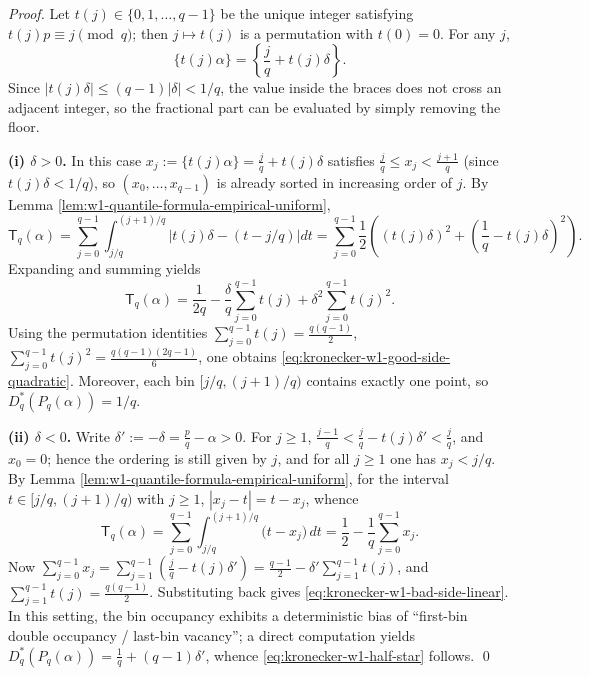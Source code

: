 \begin{proof}
Let \(t(j)\in\{0,1,\dots,q-1\}\) be the unique integer satisfying
\(
t(j)p\equiv j\pmod q
\);
then \(j\mapsto t(j)\) is a permutation with \(t(0)=0\).
For any \(j\),
\[
\{t(j)\alpha\}
=\left\{\frac{j}{q}+t(j)\delta\right\}.
\]
Since \(|t(j)\delta|\le (q-1)|\delta|<1/q\), the value inside the braces does not cross an adjacent integer, so the fractional part can be evaluated by simply removing the floor.
\par
\textbf{(i) \(\delta>0\).}
In this case \(x_j:=\{t(j)\alpha\}=\frac{j}{q}+t(j)\delta\) satisfies
\(
\frac{j}{q}\le x_j<\frac{j+1}{q}
\)
(since \(t(j)\delta<1/q\)), so \((x_0,\dots,x_{q-1})\) is already sorted in increasing order of \(j\).
By Lemma \ref{lem:w1-quantile-formula-empirical-uniform},
\[
\mathsf{T}_q(\alpha)=\sum_{j=0}^{q-1}\int_{j/q}^{(j+1)/q}\left|t(j)\delta-(t-j/q)\right|dt
=\sum_{j=0}^{q-1}\frac12\left((t(j)\delta)^2+\left(\frac1q-t(j)\delta\right)^2\right).
\]
Expanding and summing yields
\[
\mathsf{T}_q(\alpha)
=\frac1{2q}-\frac{\delta}{q}\sum_{j=0}^{q-1}t(j)+\delta^2\sum_{j=0}^{q-1}t(j)^2.
\]
Using the permutation identities
\(
\sum_{j=0}^{q-1}t(j)=\frac{q(q-1)}2
\),
\(
\sum_{j=0}^{q-1}t(j)^2=\frac{q(q-1)(2q-1)}6
\),
one obtains \eqref{eq:kronecker-w1-good-side-quadratic}.
Moreover, each bin \([j/q,(j+1)/q)\) contains exactly one point, so \(D_q^\ast(P_q(\alpha))=1/q\).
\par
\textbf{(ii) \(\delta<0\).}
Write \(\delta':=-\delta=\frac pq-\alpha>0\).
For \(j\ge 1\),
\(
\frac{j-1}{q}<\frac{j}{q}-t(j)\delta'<\frac{j}{q}
\), and \(x_0=0\);
hence the ordering is still given by \(j\), and for all \(j\ge 1\) one has \(x_j<j/q\).
By Lemma \ref{lem:w1-quantile-formula-empirical-uniform},
for the interval \(t\in[j/q,(j+1)/q)\) with \(j\ge 1\), \(|x_j-t|=t-x_j\), whence
\[
\mathsf{T}_q(\alpha)
=\sum_{j=0}^{q-1}\int_{j/q}^{(j+1)/q}\bigl(t-x_j\bigr)\,dt
=\frac12-\frac1q\sum_{j=0}^{q-1}x_j.
\]
Now
\(
\sum_{j=0}^{q-1}x_j
=\sum_{j=1}^{q-1}\left(\frac{j}{q}-t(j)\delta'\right)
=\frac{q-1}{2}-\delta'\sum_{j=1}^{q-1}t(j)
\), and \(\sum_{j=1}^{q-1}t(j)=\frac{q(q-1)}2\).
Substituting back gives \eqref{eq:kronecker-w1-bad-side-linear}.
In this setting, the bin occupancy exhibits a deterministic bias of ``first-bin double occupancy / last-bin vacancy''; a direct computation yields
\(
D_q^\ast(P_q(\alpha))=\frac1q+(q-1)\delta'
\), whence \eqref{eq:kronecker-w1-half-star} follows.
\qed
\end{proof}

